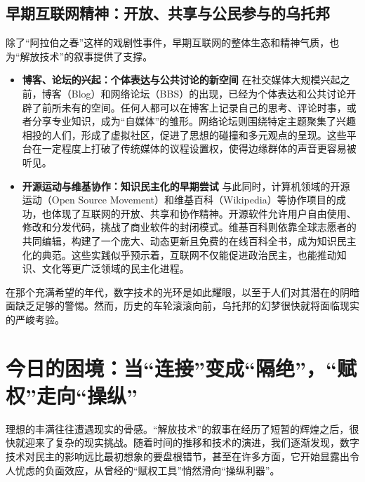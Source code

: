 \documentclass[UTF8, 10pt]{ctexbook}
\begin{document}
\subsection{早期互联网精神：开放、共享与公民参与的乌托邦}
除了“阿拉伯之春”这样的戏剧性事件，早期互联网的整体生态和精神气质，也为“解放技术”的叙事提供了支撑。
\begin{itemize}
    \item \textbf{博客、论坛的兴起：个体表达与公共讨论的新空间}
    在社交媒体大规模兴起之前，博客（Blog）和网络论坛（BBS）的出现，已经为个体表达和公共讨论开辟了前所未有的空间。任何人都可以在博客上记录自己的思考、评论时事，或者分享专业知识，成为“自媒体”的雏形。网络论坛则围绕特定主题聚集了兴趣相投的人们，形成了虚拟社区，促进了思想的碰撞和多元观点的呈现。这些平台在一定程度上打破了传统媒体的议程设置权，使得边缘群体的声音更容易被听见。

    \item \textbf{开源运动与维基协作：知识民主化的早期尝试}
    与此同时，计算机领域的开源运动（Open Source Movement）和维基百科（Wikipedia）等协作项目的成功，也体现了互联网的开放、共享和协作精神。开源软件允许用户自由使用、修改和分发代码，挑战了商业软件的封闭模式。维基百科则依靠全球志愿者的共同编辑，构建了一个庞大、动态更新且免费的在线百科全书，成为知识民主化的典范。这些实践似乎预示着，互联网不仅能促进政治民主，也能推动知识、文化等更广泛领域的民主化进程。
\end{itemize}
在那个充满希望的年代，数字技术的光环是如此耀眼，以至于人们对其潜在的阴暗面缺乏足够的警惕。然而，历史的车轮滚滚向前，乌托邦的幻梦很快就将面临现实的严峻考验。

\section{今日的困境：当“连接”变成“隔绝”，“赋权”走向“操纵”}
\lettrine[lines=2]{理}{想}的丰满往往遭遇现实的骨感。“解放技术”的叙事在经历了短暂的辉煌之后，很快就迎来了复杂的现实挑战。随着时间的推移和技术的演进，我们逐渐发现，数字技术对民主的影响远比最初想象的要盘根错节，甚至在许多方面，它开始显露出令人忧虑的负面效应，从曾经的“赋权工具”悄然滑向“操纵利器”。
\end{document}
